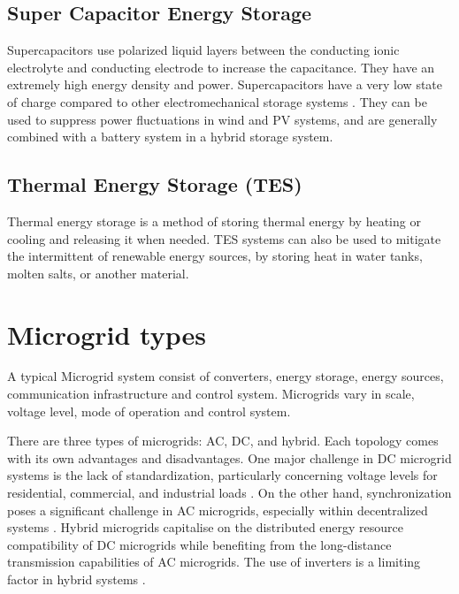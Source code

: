 \subsection{Super Capacitor Energy Storage} 
Supercapacitors use polarized liquid layers between the conducting ionic electrolyte and conducting electrode to increase the capacitance. They have an extremely high energy density and power. Supercapacitors have a very low state of charge compared to other electromechanical storage systems \cite{Amrouche2016}. They can be used to suppress power fluctuations in wind and PV systems, and are generally combined with a battery system in a hybrid storage system.

\subsection{Thermal Energy Storage (TES)} 
Thermal energy storage is a method of storing thermal energy by heating or cooling and releasing it when needed. TES systems can also be used to mitigate the intermittent of renewable energy sources, by storing heat in water tanks, molten salts, or another material.

\section{Microgrid types} 
A typical Microgrid system consist of converters, energy storage, energy sources, communication infrastructure and control system. Microgrids vary in scale, voltage level, mode of operation and control system. \par
There are three types of microgrids: AC, DC, and hybrid. Each topology comes with its own advantages and disadvantages. One major challenge in DC microgrid systems is the lack of standardization, particularly concerning voltage levels for residential, commercial, and industrial loads \cite{Rajesh2017}. On the other hand, synchronization poses a significant challenge in AC microgrids, especially within decentralized systems \cite{Tapan2018}. Hybrid microgrids capitalise on the distributed energy resource compatibility of DC microgrids while benefiting from the long-distance transmission capabilities of AC microgrids. The use of inverters is a limiting factor in hybrid systems \cite{Raza2024}.


